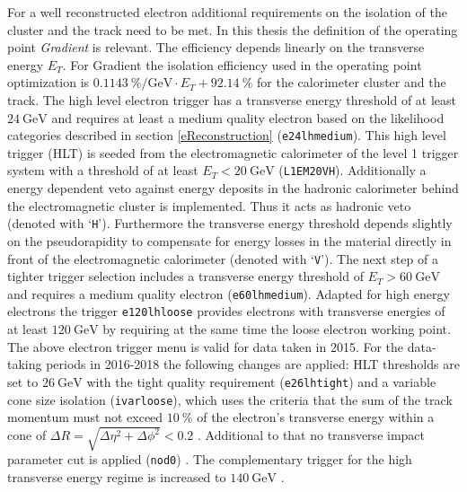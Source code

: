 For a well reconstructed electron additional requirements on the isolation of the cluster and the track need to be met. In this thesis the definition of the operating point \textit{Gradient} is relevant. The efficiency depends linearly on the transverse energy $E_T$. For Gradient the isolation efficiency used in the operating point optimization is $\SI{0.1143}{\percent\per\giga\electronvolt}\cdot E_T+\SI{92.14}{\percent}$ for the calorimeter cluster and the track. \cite{ePerformance}\newline
The high level electron trigger has a transverse energy threshold of at least $\SI{24}{\giga\electronvolt}$ and requires at least a medium quality electron based on the likelihood categories described in section \ref{eReconstruction} (\texttt{e24\textunderscore lhmedium}). This high level trigger (HLT) is seeded from the electromagnetic calorimeter of the level 1 trigger system with a threshold of at least $E_T<\SI{20}{\giga\electronvolt}$ (\texttt{L1EM20VH}). Additionally a energy dependent veto against energy deposits in the hadronic calorimeter behind  the electromagnetic cluster is implemented. Thus it acts as hadronic veto (denoted with `\texttt{H}'). Furthermore the transverse energy threshold depends slightly on the pseudorapidity to compensate for energy losses in the material directly in front of the electromagnetic calorimeter (denoted with `\texttt{V}'). The next step of a tighter trigger selection includes a transverse energy threshold of $E_T>\SI{60}{\giga\electronvolt}$ and requires a medium quality electron (\texttt{e60\textunderscore lhmedium}). Adapted for high energy electrons the trigger \texttt{e120\textunderscore lhloose} provides electrons with transverse energies of at least $\SI{120}{\giga\electronvolt}$ by requiring at the same time the loose electron working point. \cite{trigger:e:mu} The above electron trigger menu is valid for data taken in 2015. For the data-taking periods in 2016-2018 the following changes are applied:\newline
HLT thresholds are set to $\SI{26}{\giga\electronvolt}$ with the tight quality requirement (\texttt{e26\textunderscore lhtight}) and a variable cone size isolation (\texttt{ivarloose}), which uses the criteria that the sum of the track momentum must not exceed $\SI{10}{\percent}$ of the electron's transverse energy within a cone of $\Delta R=\sqrt{\Delta\eta^2+\Delta\phi^2}<0.2$ \cite{trigger:ivarloose:erkl}\cite{trigger:ivarloose:form}. Additional to that no transverse impact parameter cut is applied (\texttt{nod0}) \cite{trigger:ivarloose:erkl}. The complementary trigger for the high transverse energy regime is increased to $\SI{140}{\giga\electronvolt}$ \cite{trigger:e:mu}.

